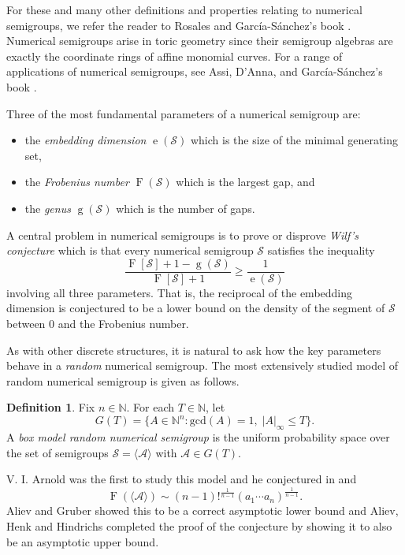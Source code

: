 \documentclass[11pt]{amsart}
\theoremstyle{definition}
\newtheorem{definition}[theorem]{Definition}
\theoremstyle{remark}
\def\NN{\ensuremath{\mathbb{N}}}
\def\cA{\ensuremath{\mathcal{A}}}
\def\nsg{\ensuremath{\mathcal{S}}}
\DeclareMathOperator\F{F}
\DeclareMathOperator\g{g}
\DeclareMathOperator\e{e}
\begin{document}
For these and many other definitions and properties relating to numerical semigroups, we refer the reader to Rosales and Garc\'ia-S\'anchez's book \cite{rosales2009numerical}. Numerical semigroups arise in toric geometry since their semigroup algebras are exactly the coordinate rings of affine monomial curves. For a range of applications of numerical semigroups, see Assi, D'Anna, and Garc\'ia-S\'anchez's book \cite{assi2020numerical}.

Three of the most fundamental parameters of a numerical semigroup are:
\begin{itemize}
\item the \emph{embedding dimension} $\e(\nsg)$ which is the size of the minimal generating set,
\item the \emph{Frobenius number} $\F(\nsg)$ which is the largest gap, and
\item the \emph{genus} $\g(\nsg)$ which is the number of gaps. 
\end{itemize}
A central problem in numerical semigroups is to prove or disprove \emph{Wilf's conjecture} \cite{wilf, delgado2020conjecture} which is that every numerical semigroup $\nsg$ satisfies the inequality
\[ \frac{\F[\nsg] + 1 - \g(\nsg)}{\F[\nsg]+1} \geq \frac{1}{\e(\nsg)} \]
involving all three parameters. That is, the reciprocal of the embedding dimension is conjectured to be a lower bound on the density of the segment of $\nsg$ between 0 and the Frobenius number. 

As with other discrete structures, it is natural to ask how the key parameters behave in a \emph{random} numerical semigroup. The most extensively studied model of random numerical semigroup is given as follows.  
\begin{definition} \label{def:randnumsems:boxmodel}
Fix $n \in \NN$. For each $T \in \NN$, let \[G(T) = \{A\in \NN^n : \mathrm{gcd}(A) = 1, \; |A|_\infty \leq T\}.\]
A \emph{box model random numerical semigroup} is the uniform probability space over the set of semigroups $\nsg = \langle\cA\rangle$ with $\cA \in G(T)$.
\end{definition}

V. I. Arnold was the first to study this model and he conjectured in \cite{arnold1999weak} and \cite{arnold2004arnold} 
\[\F(\langle\cA\rangle) \sim (n - 1)!^{\frac{1}{n - 1}}(a_1\cdots a_n)^{\frac{1}{n - 1}}.\]
Aliev and Gruber \cite{aliev2007optimal} showed this to be a correct asymptotic lower bound and Aliev, Henk and Hindrichs \cite{aliev2011expected} completed the proof of the conjecture by showing it to also be an asymptotic upper bound. 
\end{document}
